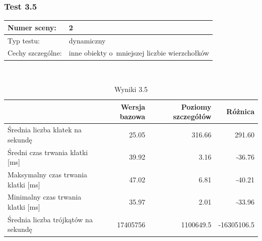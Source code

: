 \documentclass[a4paper,twoside,12pt]{book}
\begin{document}
\vbox{}

\subsubsection{Test 3.5}
\begin{tabular}{|l||l|}
\hline
Numer sceny: & 2 \\
\hline
Typ testu: & dynamiczny \\
\hline
Cechy szczególne: & inne obiekty o~mniejszej liczbie wierzchołków \\
\hline
\end{tabular}\\

\vbox{}

\begin{table}[H]
    \centering
    \caption{Wyniki 3.5}
    \label{tab:lod_test5}
    \begin{tabular}{|l||r|r|r|}
        \hline
        & Wersja bazowa & Poziomy szczegółów & Różnica \\
        \hline
        Średnia liczba klatek na sekundę & 25.05 & 316.66 & 291.60 \\
        \hline
        Średni czas trwania klatki [ms] & 39.92 & 3.16 & -36.76 \\
        \hline
        Maksymalny czas trwania klatki [ms] & 47.02 & 6.81 & -40.21 \\
        \hline
        Minimalny czas trwania klatki [ms] & 35.97 & 2.01 & -33.96 \\
        \hline
        Średnia liczba trójkątów na sekundę & 17405756 & 1100649.5 & -16305106.5 \\
        \hline
    \end{tabular}
\end{table}

\vbox{}
\end{document}
